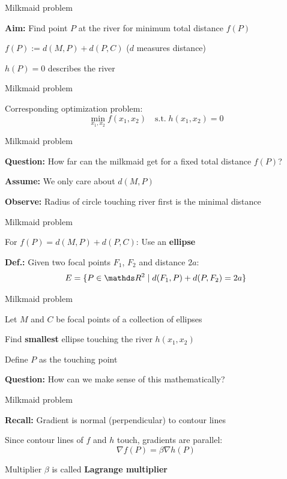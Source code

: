 \documentclass[11pt,compress,t,notes=noshow, xcolor=table]{beamer}
\begin{document}
\begin{framei}{Milkmaid problem}
\item \textbf{Aim:} Find point $P$ at the river for minimum total distance $f(P)$
\item $f(P) := d(M, P) + d(P, C)$ ($d$ measures distance)
\item $h(P) = 0$ describes the river
\vfill
{}
\end{framei}


\begin{framei}{Milkmaid problem}
\item Corresponding optimization problem:
$$
\min_{x_1, x_2} f(x_1, x_2) \quad \text{s.t.} \; h(x_1, x_2) = 0
$$
\vfill
{}
\end{framei}


\begin{framei}{Milkmaid problem}
\item \textbf{Question:} How far can the milkmaid get for a fixed total distance $f(P)$?
\item \textbf{Assume:} We only care about $d(M,P)$
\vfill
{}
\item \textbf{Observe:} Radius of circle touching river first is the minimal distance
\end{framei}


\begin{framei}{Milkmaid problem}
\item For $f(P) = d(M,P) + d(P,C)$: Use an \textbf{ellipse}
\item \textbf{Def.:} Given two focal points $F_1$, $F_2$ and distance $2a$:
$$
E = \{ P \in \R^2 \;|\; d(F_1,P) + d(P,F_2) = 2a \}
$$
\end{framei}


\begin{framei}{Milkmaid problem}
\item Let $M$ and $C$ be focal points of a collection of ellipses
\item Find \textbf{smallest} ellipse touching the river $h(x_1, x_2)$
\item Define $P$ as the touching point
\item \textbf{Question:} How can we make sense of this mathematically?
\end{framei}


\begin{framei}{Milkmaid problem}
\item \textbf{Recall:} Gradient is normal (perpendicular) to contour lines
\item Since contour lines of $f$ and $h$ touch, gradients are parallel:
$$
\nabla f(P) = \beta \nabla h(P)
$$
\item Multiplier $\beta$ is called \textbf{Lagrange multiplier}
\end{framei}
\end{document}
